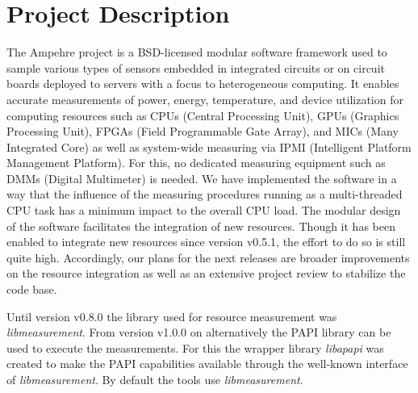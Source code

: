 %
%
%
%
%
%

\section{Project Description}
The Ampehre project is a BSD-licensed modular software framework used to sample various types of sensors embedded in integrated circuits or on circuit boards deployed to servers with a focus to heterogeneous computing.
It enables accurate measurements of power, energy, temperature, and device utilization for computing resources such as CPUs (Central Processing Unit), GPUs (Graphics Processing Unit), FPGAs (Field Programmable Gate Array), and MICs (Many Integrated Core) as well as system-wide measuring via IPMI (Intelligent Platform Management Platform).
For this, no dedicated measuring equipment such as DMMs (Digital Multimeter) is needed.
We have implemented the software in a way that the influence of the measuring procedures running as a multi-threaded CPU task has a minimum impact to the overall CPU load.
The modular design of the software facilitates the integration of new resources.
 Though it has been enabled to integrate new resources since version v0.5.1, the effort to do so is still quite high.
Accordingly, our plans for the next releases are broader improvements on the resource integration as well as an extensive project review to stabilize the code base.

Until version v0.8.0 the library used for resource measurement was \emph{libmeasurement}.
From version v1.0.0 on alternatively the PAPI library can be used to execute the measurements.
For this the wrapper library \emph{libapapi} was created to make the PAPI capabilities available through the well-known interface of \emph{libmeasurement}.
By default the tools use \emph{libmeasurement}.
